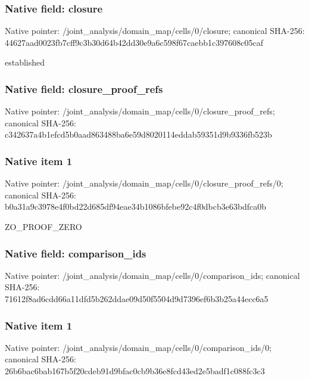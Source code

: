 \documentclass[10pt,a4paper]{article}
\begin{document}
\subsubsection{Native field: closure}
Native pointer: /joint\_\allowbreak{}analysis/domain\_\allowbreak{}map/cells/0/closure; canonical SHA-256: 44627aad0023fb7cff9c3b30d64b42dd30e9a6c598f67caebb1c397608c05caf

\begingroup\raggedright\sloppy established\par\endgroup

\subsubsection{Native field: closure\_\allowbreak{}proof\_\allowbreak{}refs}
Native pointer: /joint\_\allowbreak{}analysis/domain\_\allowbreak{}map/cells/0/closure\_\allowbreak{}proof\_\allowbreak{}refs; canonical SHA-256: c342637a4b1efcd5b0aad863488ba6e59d8020114eddab59351d9b9336fb523b

\subsubsection{Native item 1}
Native pointer: /joint\_\allowbreak{}analysis/domain\_\allowbreak{}map/cells/0/closure\_\allowbreak{}proof\_\allowbreak{}refs/0; canonical SHA-256: b0a31a9c3978e4f0bd22d685df94eae34b1086bfebe92c4f0dbcb3e63bdfca0b

\begingroup\raggedright\sloppy ZO\_\allowbreak{}PROOF\_\allowbreak{}ZERO\par\endgroup

\subsubsection{Native field: comparison\_\allowbreak{}ids}
Native pointer: /joint\_\allowbreak{}analysis/domain\_\allowbreak{}map/cells/0/comparison\_\allowbreak{}ids; canonical SHA-256: 71612f8ad6cdd66a11dfd5b262ddae09d50f5504d9d7396ef6b3b25a44ecc6a5

\subsubsection{Native item 1}
Native pointer: /joint\_\allowbreak{}analysis/domain\_\allowbreak{}map/cells/0/comparison\_\allowbreak{}ids/0; canonical SHA-256: 26b6bac6bab167b5f20cdeb91d9bfac0cb9b36e8fcd43ed2e5badf1c088fc3c3
\end{document}
